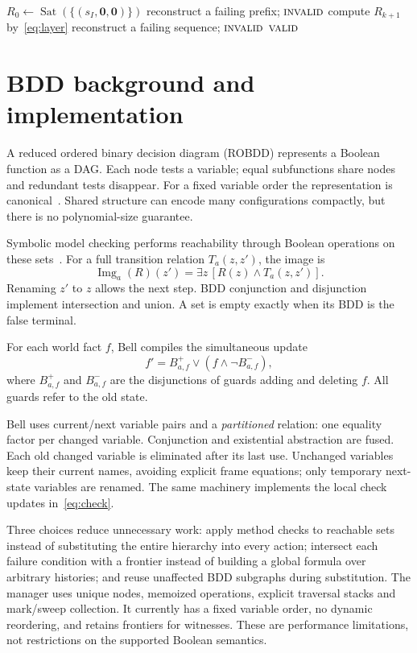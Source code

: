 \documentclass[10pt,a4paper,twocolumn]{article}
\newcommand{\Valid}{\textsc{valid}}
\newcommand{\Invalid}{\textsc{invalid}}
\begin{document}
\begin{algorithm}[H]
\caption{Universal execution validation}
\small
\begin{algorithmic}[1]
\State $R_0\gets\operatorname{Sat}(\{(s_I,\mathbf0,\mathbf0)\})$
      \State reconstruct a failing prefix; \Return $\Invalid$
    \EndIf
  \EndFor
  \State compute $R_{k+1}$ by~\eqref{eq:layer}
\EndFor
{}
  \State reconstruct a failing sequence; \Return $\Invalid$
\EndIf
\State \Return $\Valid$
\end{algorithmic}
\end{algorithm}

\section{BDD background and implementation}
A reduced ordered binary decision diagram (ROBDD) represents a Boolean function
as a DAG. Each node tests a variable; equal subfunctions share nodes and redundant
tests disappear. For a fixed variable order the representation is
canonical~\cite{bryant}. Shared structure can encode many configurations
compactly, but there is no polynomial-size guarantee.

Symbolic model checking performs reachability through Boolean operations on
these sets~\cite{burch}. For a full transition relation $T_a(z,z')$, the image is
\[
 \operatorname{Img}_a(R)(z')=\exists z\,[R(z)\land T_a(z,z')].
\]
Renaming $z'$ to $z$ allows the next step. BDD conjunction and disjunction
implement intersection and union. A set is empty exactly when its BDD is the
false terminal.

For each world fact $f$, Bell compiles the simultaneous update
\[
 f'=B^+_{a,f}\lor(f\land\neg B^-_{a,f}),
\]
where $B^+_{a,f}$ and $B^-_{a,f}$ are the disjunctions of guards adding and
deleting $f$. All guards refer to the old state.

Bell uses current/next variable pairs and a \emph{partitioned} relation:
one equality factor per changed variable. Conjunction and existential
abstraction are fused. Each old changed variable is eliminated after its last
use. Unchanged variables keep their current names, avoiding explicit frame
equations; only temporary next-state variables are renamed. The same machinery
implements the local check updates in~\eqref{eq:check}.

Three choices reduce unnecessary work: apply method checks to reachable sets
instead of substituting the entire hierarchy into every action; intersect each
failure condition with a frontier instead of building a global formula over
arbitrary histories; and reuse unaffected BDD subgraphs during substitution.
The manager uses unique nodes, memoized operations, explicit traversal stacks
and mark/sweep collection. It currently has a fixed variable order, no dynamic
reordering, and retains frontiers for witnesses. These are performance
limitations, not restrictions on the supported Boolean semantics.
\end{document}
